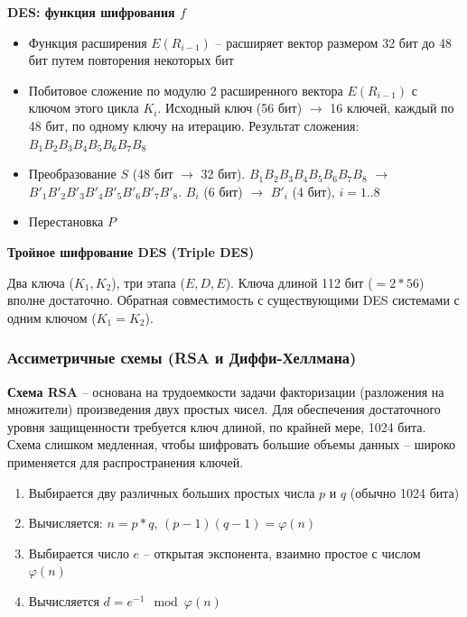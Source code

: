 \textbf{DES: функция шифрования $f$}

\begin{itemize}
    \item Функция расширения $E(R_{i-1})$ -- расширяет вектор размером 32 бит до 48 бит путем повторения некоторых бит
    \item Побитовое сложение по модулю 2 расширенного вектора $E(R_{i-1})$ с ключом этого цикла $K_i$. Исходный ключ (56 бит) $\rightarrow$ 16 ключей, каждый по 48 бит, по одному ключу на итерацию. Результат сложения: $B_1B_2B_3B_4B_5B_6B_7B_8$
\end{itemize}

\begin{itemize}
    \item Преобразование $S$ (48 бит $\rightarrow$ 32 бит).
    $B_1B_2B_3B_4B_5B_6B_7B_8$ $\rightarrow$ $B'_1B'_2B'_3B'_4B'_5B'_6B'_7B'_8$.
    $B_i$ (6 бит) $\rightarrow$ $B'_i$ (4 бит), $i = 1..8$
    \item Перестановка $P$
\end{itemize}

\textbf{Тройное шифрование DES (Triple DES)}

Два ключа ($K_1, K_2$), три этапа ($E, D, E$). Ключа длиной 112 бит ($= 2 * 56$) вполне достаточно. Обратная совместимость с существующими DES системами с одним ключом ($K_1 = K_2$).

\subsubsection{Ассиметричные схемы (RSA и Диффи-Хеллмана)}

\textbf{Схема RSA} -- основана на трудоемкости задачи факторизации (разложения на множители) произведения двух простых чисел. Для обеспечения достаточного уровня защищенности требуется ключ длиной, по крайней мере, 1024 бита. Схема слишком медленная, чтобы шифровать большие объемы данных – широко применяется для распространения ключей.

\begin{enumerate}
    \item Выбирается дву различных больших простых числа $p$ и $q$ (обычно 1024 бита)
    \item Вычисляется: $n = p*q$, $(p - 1)(q - 1) = \varphi(n)$
    \item Выбирается число $e$ -- открытая экспонента, взаимно простое с числом $\varphi(n)$
    \item Вычисляется $d = e^{-1} \mod \varphi(n)$
\end{enumerate}

